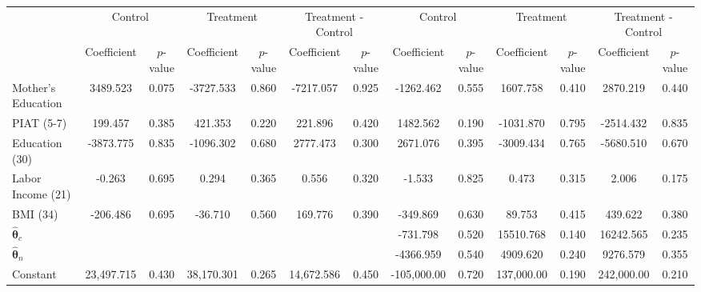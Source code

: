 \begin{tabular}{lcccccccccccc} \toprule
&\multicolumn{2}{c}{Control} & \multicolumn{2}{c}{Treatment} & \multicolumn{2}{c}{Treatment - Control} & \multicolumn{2}{c}{Control} & \multicolumn{2}{c}{Treatment} & \multicolumn{2}{c}{Treatment - Control} \\
 & Coefficient  & $p$-value  & Coefficient  & $p$-value & Coefficient  & $p$-value  & Coefficient  & $p$-value  & Coefficient  & $p$-value  & Coefficient  & $p$-value \\ \midrule
Mother's Education &  3489.523 &     0.075 & -3727.533 &     0.860 & -7217.057 &     0.925 & -1262.462 &     0.555 &  1607.758 &     0.410 &  2870.219 &     0.440 \\  
PIAT (5-7) &   199.457 &     0.385 &   421.353 &     0.220 &   221.896 &     0.420 &  1482.562 &     0.190 & -1031.870 &     0.795 & -2514.432 &     0.835 \\  
Education (30) & -3873.775 &     0.835 & -1096.302 &     0.680 &  2777.473 &     0.300 &  2671.076 &     0.395 & -3009.434 &     0.765 & -5680.510 &     0.670 \\  
Labor Income (21) &    -0.263 &     0.695 &     0.294 &     0.365 &     0.556 &     0.320 &    -1.533 &     0.825 &     0.473 &     0.315 &     2.006 &     0.175 \\  
BMI (34) &  -206.486 &     0.695 &   -36.710 &     0.560 &   169.776 &     0.390 &  -349.869 &     0.630 &    89.753 &     0.415 &   439.622 &     0.380 \\  
$\hat{\bm{\theta}}_c$ &         &         &         &         &         &         &  -731.798 &     0.520 & 15510.768 &     0.140 & 16242.565 &     0.235 \\  
$\hat{\bm{\theta}}_n$ &         &         &         &         &         &         & -4366.959 &     0.540 &  4909.620 &     0.240 &  9276.579 &     0.355 \\  
Constant & 23,497.715 &     0.430 & 38,170.301 &     0.265 & 14,672.586 &     0.450 & -105,000.00 &     0.720 &  137,000.00 &     0.190 &  242,000.00 &     0.210 \\  
\bottomrule \end{tabular}
